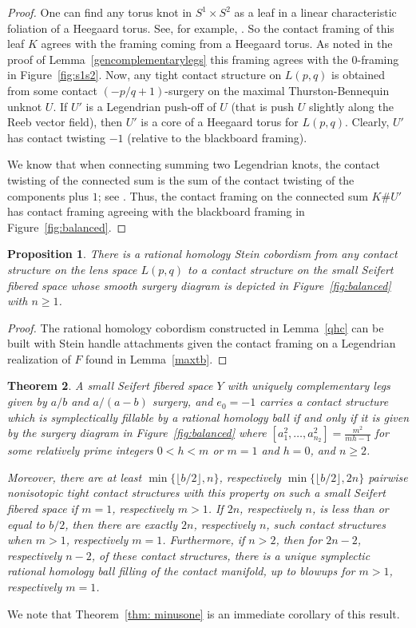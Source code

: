 \documentclass[11pt]{amsart}
\theoremstyle{plain}
\newtheorem{theorem}{Theorem}
\newtheorem{proposition}[theorem]{Proposition}
\theoremstyle{definition}
\theoremstyle{remark}
\numberwithin{theorem}{section}
\begin{document}
\begin{proof}
One can find any torus knot in $S^1\times S^2$ as a leaf in a linear characteristic foliation of a Heegaard torus. See, for example, \cite[Lemma~4.2]{EtnyreOzbagciTosun2025}. So the contact framing of this leaf $K$ agrees with the framing coming from a Heegaard torus. As noted in the proof of Lemma~\ref{gencomplementarylegs} this framing agrees with the $0$-framing in Figure~\ref{fig:s1s2}. Now, any tight contact structure on $L(p,q)$ is obtained from some contact $(-p/q+1)$-surgery on the maximal Thurston-Bennequin unknot $U$. If $U'$ is a Legendrian push-off of $U$ (that is push $U$ slightly along the Reeb vector field), then $U'$ is a core of a Heegaard torus for $L(p,q)$. Clearly, $U'$ has contact twisting $-1$ (relative to the blackboard framing).  

We know that when connecting summing two Legendrian knots, the contact twisting of the connected sum is the sum of the contact twisting of the components plus $1$; see \cite{EtnyreHonda03}. Thus, the contact framing on the connected sum $K\# U'$ has contact framing agreeing with the blackboard framing in Figure~\ref{fig:balanced}.
\end{proof}

\begin{proposition}\label{SteinCobord}
There is a rational homology Stein cobordism from any contact structure on the lens space $L(p,q)$ to a contact structure on the small Seifert fibered space whose smooth surgery diagram is depicted in Figure~\ref{fig:balanced} with $n\geq 1$. 
\end{proposition}
\begin{proof}
The rational homology cobordism constructed in Lemma~\ref{qhc} can be built with Stein handle attachments given the contact framing on a Legendrian realization of $F$ found in Lemma~\ref{maxtb}. 
\end{proof}



\begin{theorem}\label{maine00}
A small Seifert fibered space $Y$ with uniquely complementary legs given by $a/b$ and $a/(a-b)$ surgery, and $e_0=-1$ carries a contact structure which is symplectically fillable by a rational homology ball if and only if it is given by the surgery diagram in Figure~\ref{fig:balanced} where $[a^2_1,\ldots, a^2_{n_2}]=\frac {m^2}{mh-1}$ for some relatively prime integers $0<h<m$ or $m=1$ and $h=0$, and $n\geq 2$.

Moreover, there are at least $\min\{\lfloor b/2\rfloor,n\}$, respectively $\min\{\lfloor b/2\rfloor,2n\}$ pairwise nonisotopic tight contact structures with this property on such a small Seifert fibered space if $m=1$, respectively $m>1$. If $2n$, respectively $n$, is less than or equal to $b/2$, then there are exactly $2n$, respectively $n$,  such contact structures when $m>1$, respectively $m=1$. Furthermore, if $n>2$, then for $2n-2$, respectively $n-2$, of these contact structures, there is a unique symplectic rational homology ball filling of the contact manifold, up to blowups for $m>1$, respectively $m=1$. 
\end{theorem}
We note that Theorem~\ref{thm: minusone} is an immediate corollary of this result. 
\end{document}
